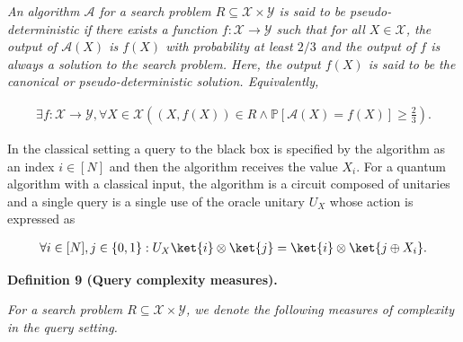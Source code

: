 \emph{An algorithm $\mathcal{A}$ for a search problem ${R}\subseteq\mathcal{X}\times\mathcal{Y}$ is said to be pseudo-deterministic if there exists a function $f:\mathcal{X}\rightarrow\mathcal{Y}$ such that for all $X\in\mathcal{X}$, the output of $\mathcal{A}(X)$ is $f(X)$ with probability at least $2/3$ and the output of $f$ is always a solution to the search problem. Here, the output $f(X)$ is said to be the canonical or pseudo-deterministic solution. Equivalently,}\par


\[\begin{gathered}
\exists f:\mathcal{X}\rightarrow\mathcal{Y},\forall X\in\mathcal{X}\left((X,f(X))\in{R}\wedge\mathbb{P}[\mathcal{A}(X)=f(X)]\geq\frac{2}{3}\right).
\end{gathered}\]






In the classical setting a query to the black box is specified by the algorithm as an index $i\in[N]$ and then the algorithm receives the value $X_{i}$. For a quantum algorithm with a classical input, the algorithm is a circuit composed of unitaries and a single query is a single use of the oracle unitary $U_{X}$ whose action is expressed as\par


\[\begin{gathered}
\forall i\in[N],j\in\{0,1\}:U_{X}\ket{i}\otimes\ket{j}=\ket{i}\otimes\ket{j\oplus X_{i}}.
\end{gathered}\]





\par\medskip\noindent\textbf{
\textbf{Definition 9}\textbf{ }(Query complexity measures)\textbf{.}
}\par



\emph{For a search problem ${R}\subseteq\mathcal{X}\times\mathcal{Y}$, we denote the following measures of complexity in the query setting.}\par


